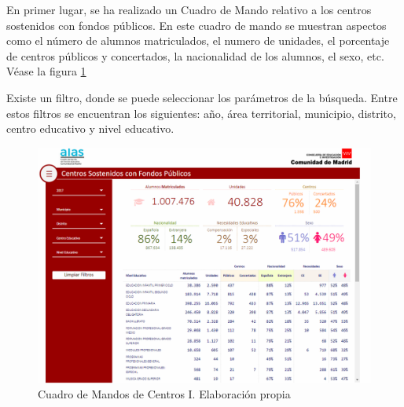 \begin{subappendices}
En primer lugar, se ha realizado un Cuadro de Mando relativo a los centros sostenidos con fondos públicos. En este cuadro de mando se muestran aspectos como el número de alumnos matriculados, el numero de unidades, el porcentaje de centros públicos y concertados, la nacionalidad de los alumnos, el sexo, etc. Véase la figura \ref{fig:CentrosResumenI}

Existe un filtro, donde se puede seleccionar los parámetros de la búsqueda. Entre estos filtros se encuentran los siguientes: año, área territorial, municipio, distrito, centro educativo y nivel educativo.

\begin{figure}[htb]
	\centering
	\caption{Cuadro de Mandos de Centros I. Elaboración propia}
	\label{fig:CentrosResumenI}
	\includegraphics[width=1\textwidth]{recursos/CentrosResumenI}
\end{figure}


\end{subappendices}

